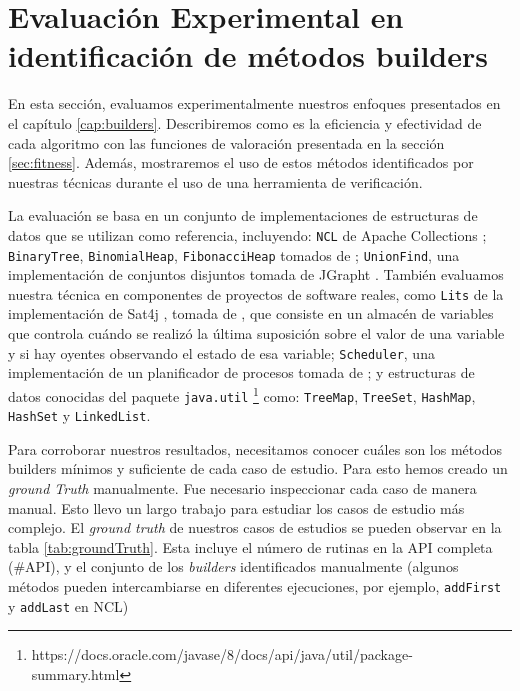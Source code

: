 
\section{Evaluación Experimental en identificación de métodos builders}
En esta sección, evaluamos experimentalmente nuestros enfoques presentados en el capítulo \ref{cap:builders}. Describiremos como es la eficiencia y efectividad de cada algoritmo con las funciones de valoración presentada en la sección \ref{sec:fitness}. Además, mostraremos el uso de estos métodos identificados por nuestras técnicas durante el uso de una herramienta de verificación.

La evaluación se basa en un conjunto de implementaciones de estructuras de datos que se utilizan como referencia, incluyendo: \verb"NCL" de Apache Collections \cite{apache}; \verb"BinaryTree", \verb"BinomialHeap", \verb"FibonacciHeap" tomados de \cite{Visser:2006}; \verb"UnionFind", una implementación de conjuntos disjuntos tomada de JGrapht \cite{jgrapht}. También evaluamos nuestra técnica en componentes de proyectos de software reales, como \verb"Lits" de la implementación de Sat4j \cite{sat4j}, tomada de \cite{Loncaric:2018}, que consiste en un almacén de variables que controla cuándo se realizó la última suposición sobre el valor de una variable y si hay oyentes observando el estado de esa variable; \verb"Scheduler", una implementación de un planificador de procesos tomada de \cite{sir}; y estructuras de datos conocidas del paquete \verb"java.util" \footnote{https://docs.oracle.com/javase/8/docs/api/java/util/package-summary.html} como: \verb"TreeMap", \verb"TreeSet", \verb"HashMap", \verb"HashSet" y \verb"LinkedList". 

Para corroborar nuestros resultados, necesitamos conocer cuáles son los métodos builders mínimos y suficiente de cada caso de estudio. Para esto hemos creado un \emph{ground Truth} manualmente. Fue necesario inspeccionar cada caso de manera manual. Esto llevo un largo trabajo para estudiar los casos de estudio más complejo. El \emph{ground truth} de nuestros casos de estudios se pueden observar en la tabla \ref{tab:groundTruth}. Esta incluye el número de rutinas en la API completa (\#API), y el conjunto de los \emph{builders} identificados manualmente (algunos métodos pueden intercambiarse en diferentes ejecuciones, por ejemplo, \texttt{addFirst} y \texttt{addLast} en NCL)
    
